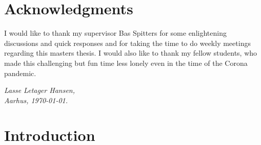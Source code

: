 \documentclass[twoside,11pt,openright]{report}
\theoremstyle{plain} %
\theoremstyle{definition}
\theoremstyle{remark}
\begin{document}

\chapter*{Acknowledgments}
I would like to thank my supervisor Bas Spitters for some enlightening discussions and quick responses and for taking the time to do weekly meetings regarding this masters thesis. I would also like to thank my fellow students, who made this challenging but fun time less lonely even in the time of the Corona pandemic.
\vspace{2ex}
\begin{flushright}
  \emph{Lasse Letager Hansen,}\\
  \emph{Aarhus, \today.}
\end{flushright}

\tableofcontents
\cleardoublepage
{}
\setcounter{secnumdepth}{3} %


\chapter{Introduction} %
\label{ch:intro}

\end{document}
